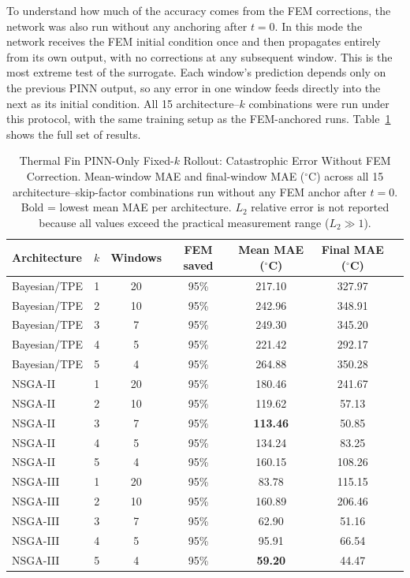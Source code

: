 To understand how much of the accuracy comes from the FEM corrections, the
network was also run without any anchoring after $t=0$. In this mode the
network receives the FEM initial condition once and then propagates entirely
from its own output, with no corrections at any subsequent window. This is the
most extreme test of the surrogate. Each window's prediction depends only on
the previous PINN output, so any error in one window feeds directly into the
next as its initial condition. All 15 architecture--$k$ combinations were run
under this protocol, with the same training setup as the FEM-anchored runs.
Table~\ref{tab:tf_pinn_only_fixed} shows the full set of results.

\begin{table}[H]
\centering
\caption{Thermal Fin PINN-Only Fixed-$k$ Rollout: Catastrophic Error Without FEM Correction.
Mean-window MAE and final-window MAE ($^\circ\mathrm{C}$) across all 15 architecture--skip-factor
combinations run without any FEM anchor after $t=0$.  Bold = lowest mean MAE per architecture.
$L_2$ relative error is not reported because all values exceed the practical measurement range ($L_2 \gg 1$).}
\label{tab:tf_pinn_only_fixed}
\small
\setlength{\tabcolsep}{4pt}
\begin{tabular}{lcccccc}
\toprule
Architecture & $k$ & Windows & FEM saved & Mean MAE ($^\circ$C) & Final MAE ($^\circ$C) \\
\midrule
Bayesian/TPE & 1 & 20 & 95\% & 217.10 & 327.97 \\
Bayesian/TPE & 2 & 10 & 95\% & 242.96 & 348.91 \\
Bayesian/TPE & 3 &  7 & 95\% & 249.30 & 345.20 \\
Bayesian/TPE & 4 &  5 & 95\% & 221.42 & 292.17 \\
Bayesian/TPE & 5 &  4 & 95\% & 264.88 & 350.28 \\
\midrule
NSGA-II      & 1 & 20 & 95\% & 180.46 & 241.67 \\
NSGA-II      & 2 & 10 & 95\% & 119.62 &  57.13 \\
NSGA-II      & 3 &  7 & 95\% & \textbf{113.46} &  50.85 \\
NSGA-II      & 4 &  5 & 95\% & 134.24 &  83.25 \\
NSGA-II      & 5 &  4 & 95\% & 160.15 & 108.26 \\
\midrule
NSGA-III     & 1 & 20 & 95\% &  83.78 & 115.15 \\
NSGA-III     & 2 & 10 & 95\% & 160.89 & 206.46 \\
NSGA-III     & 3 &  7 & 95\% &  62.90 &  51.16 \\
NSGA-III     & 4 &  5 & 95\% &  95.91 &  66.54 \\
NSGA-III     & 5 &  4 & 95\% & \textbf{59.20} &  44.47 \\
\bottomrule
\end{tabular}
\end{table}

